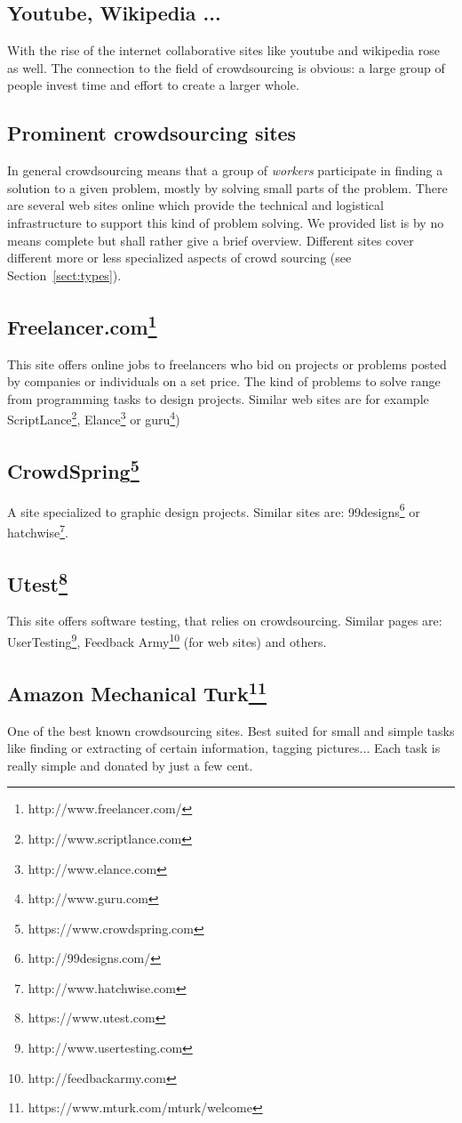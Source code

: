 \documentclass{acm_proc_article-sp}
\begin{document}
\subsection*{Youtube, Wikipedia ...}
With the rise of the internet collaborative sites like youtube and wikipedia rose as well. The connection to the field of crowdsourcing is obvious: a large group of people invest time and effort to create a larger whole.

\subsection{Prominent crowdsourcing sites}
In general crowdsourcing means that a group of \textit{workers} participate in finding a solution to a given problem, mostly by solving small parts of the problem. There are several web sites online which provide the technical and logistical infrastructure to support this kind of problem solving. We provided list is by no means complete but shall rather give a brief overview. Different sites cover different more or less specialized aspects of crowd sourcing (see Section~\ref{sect:types}).
\subsection*{Freelancer.com\footnote{http://www.freelancer.com/}}
This site offers online jobs to freelancers who bid on projects or problems posted by companies or individuals on a set price. The kind of problems to solve range from programming tasks to design projects. Similar web sites are for example ScriptLance\footnote{http://www.scriptlance.com}, Elance\footnote{http://www.elance.com} or guru\footnote{http://www.guru.com})
\subsection*{CrowdSpring\footnote{https://www.crowdspring.com}}
A site specialized to graphic design projects. Similar sites are: 99designs\footnote{http://99designs.com/} or hatchwise\footnote{http://www.hatchwise.com}.
\subsection*{Utest\footnote{https://www.utest.com}}
This site offers software testing, that relies on crowdsourcing. Similar pages are: UserTesting\footnote{http://www.usertesting.com}, Feedback Army\footnote{http://feedbackarmy.com} (for web sites) and others.
\subsection*{Amazon Mechanical Turk\footnote{https://www.mturk.com/mturk/welcome}}
One of the best known crowdsourcing sites. Best suited for small and simple tasks like finding or extracting of certain information, tagging pictures... Each task is really simple and donated by just a few cent.
\end{document}
